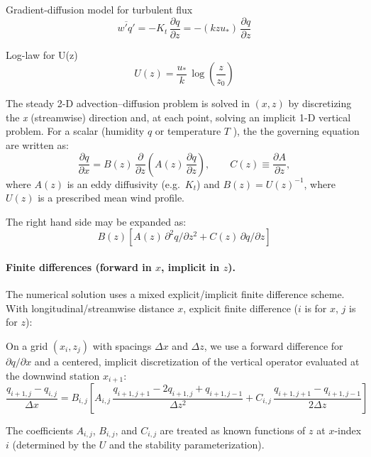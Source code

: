 \documentclass{article}
\begin{document}
    Gradient-diffusion model for turbulent flux
    $$
    \overline{w' q'}
    = -K_t\,\frac{\partial q}{\partial z}
    = -(k z u_*)\,\frac{\partial q}{\partial z}
    $$

    Log-law for U(z)
    $$
    U(z)=\frac{u_*}{k}\,\log\!\left(\frac{z}{z_0}\right)
    $$

    The steady 2-D advection--diffusion problem is solved in $(x,z)$ by discretizing the
    \textit{x} (streamwise) direction and, at each point, solving an implicit 1-D vertical problem.
    For a  scalar (humidity $q$ or temperature $T$ ), the the governing equation are written as: 
    \begin{equation}
    \frac{\partial q}{\partial x}
    =
    B(z)\,\frac{\partial}{\partial z}\!\left(A(z)\,\frac{\partial q}{\partial z}\right),
    \qquad
    C(z)\equiv \frac{\partial A}{\partial z},
    \end{equation}
    where $A(z)$ is an eddy diffusivity (e.g.\ $K_t$) and
    $B(z)=U(z)^{-1}$, where $U(z)$ is a prescribed mean wind profile. 

    The right hand side may be expanded as:
    $$B(z)\left[A(z)\,\partial^2 q/\partial z^2 + C(z)\,\partial q/\partial z\right]$$
    \paragraph{Finite differences (forward in $x$, implicit in $z$).}

    The numerical solution uses a mixed explicit/implicit finite difference scheme. 
    With longitudinal/streamwise distance $x$,  explicit finite difference ($i$ is for $x$, $j$ is for $z$):

    On a grid $(x_i,z_j)$ with spacings $\Delta x$ and $\Delta z$, we use a forward difference for $\partial q/\partial x$ and a centered, implicit discretization of the vertical operator
    evaluated at the downwind station $x_{i+1}$:
    \begin{equation}
    \frac{q_{i+1,j}-q_{i,j}}{\Delta x}
    =
    B_{i,j}
    \left[
    A_{i,j}\,\frac{q_{i+1,j+1}-2q_{i+1,j}+q_{i+1,j-1}}{\Delta z^2}
    +
    C_{i,j}\,\frac{q_{i+1,j+1}-q_{i+1,j-1}}{2\Delta z}
    \right]
    \label{eq:scheme}
    \end{equation}

    The coefficients $A_{i,j}$, $B_{i,j}$, and $C_{i,j}$ are treated as known functions of $z$ at $x$-index $i$ 
    (determined by the $U$ and the stability parameterization).
\end{document}
